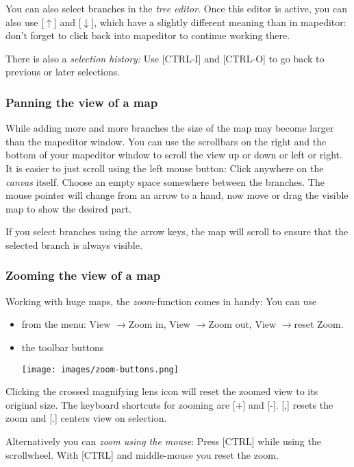 \documentclass[12pt,a4paper]{article}
\newcommand{\ra}{$\longrightarrow$}
\newcommand{\ua}{$\uparrow$}
\newcommand{\da}{$\downarrow$}
\newcommand{\key}[1]{[#1]}
\begin{document}
You can also select branches in the {\em tree editor}. Once this editor
is active, you can also use \key{\ua} and \key {\da}, which have a
slightly different meaning than in mapeditor: don't forget to click back
into mapeditor to continue working there.

There is also a {\em selection history:} Use \key{CTRL-I} and
\key{CTRL-O} to go back to previous or later selections.

\subsubsection*{Panning the view of a map}
While adding more and more branches the size of the map may become
larger than the mapeditor window. You can use the scrollbars on the
right and the bottom of your mapeditor window to scroll the view up or
down or left or right. It is easier to just scroll using the left mouse
button: Click anywhere on the {\em canvas} itself. Choose an empty space
somewhere between the branches. The mouse pointer will change from an
arrow to a hand, now move or drag the visible map to show the desired
part.

If you select branches using the arrow keys, the map will scroll to
ensure that the selected branch is always visible.

\subsubsection*{Zooming the view of a map}
Working with huge maps, the {\em zoom}-function comes in handy: You can
use 
\begin{itemize}
    \item from the menu: View \ra Zoom in, View \ra Zoom out, View \ra reset Zoom.
    \item the toolbar buttons 
        \begin{center}
            \texttt{[image: images/zoom-buttons.png]}
        \end{center}    
\end{itemize}   
Clicking the crossed magnifying lens icon will reset the zoomed view to
its original size.  The keyboard shortcuts for zooming are \key{+} and
\key{-}. \key{,} resets the zoom and \key{.} centers view on selection.

Alternatively you can {\em zoom using the mouse}: Press \key{CTRL} while
using the scrollwheel. With \key{CTRL} and middle-mouse you reset the
zoom.
\end{document}
